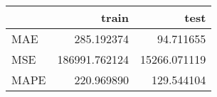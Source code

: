 \begin{tabular}{lrr}
\toprule
{} &          train &          test \\
\midrule
MAE  &     285.192374 &     94.711655 \\
MSE  &  186991.762124 &  15266.071119 \\
MAPE &     220.969890 &    129.544104 \\
\bottomrule
\end{tabular}
